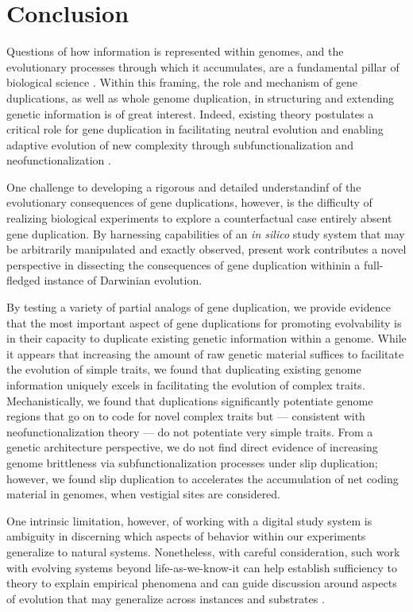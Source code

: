 \section{Conclusion} \label{sec:conclusion}

Questions of how information is represented within genomes, and the evolutionary processes through which it accumulates, are a fundamental pillar of biological science \citep{adami2024evolution}.
Within this framing, the role and mechanism of gene duplications, as well as whole genome duplication, in structuring and extending genetic information is of great interest.
Indeed, existing theory postulates a critical role for gene duplication in facilitating neutral evolution and enabling adaptive evolution of new complexity through subfunctionalization and neofunctionalization \citep{ohno1970evolution}.

One challenge to developing a rigorous and detailed understandinf of the evolutionary consequences of gene duplications, however, is the difficulty of realizing biological experiments to explore a counterfactual case entirely absent gene duplication.
By harnessing capabilities of an \textit{in silico} study system that may be arbitrarily manipulated and exactly observed, present work contributes a novel perspective in dissecting the consequences of gene duplication withinin a full-fledged instance of Darwinian evolution.

By testing a variety of partial analogs of gene duplication, we provide evidence that the most important aspect of gene duplications for promoting evolvability is in their capacity to duplicate existing genetic information within a genome.
While it appears that increasing the amount of raw genetic material suffices to facilitate the evolution of simple traits, we found that duplicating existing genome information uniquely excels in facilitating the evolution of complex traits.
Mechanistically, we found that duplications significantly potentiate genome regions that go on to code for novel complex traits but --- consistent with neofunctionalization theory --- do not potentiate very simple traits.
From a genetic architecture perspective, we do not find direct evidence of increasing genome brittleness via subfunctionalization processes under slip duplication; however, we found slip duplication to accelerates the accumulation of net coding material in genomes, when vestigial sites are considered.

One intrinsic limitation, however, of working with a digital study system is ambiguity in discerning which aspects of behavior within our experiments generalize to natural systems.
Nonetheless, with careful consideration, such work with evolving systems beyond life-as-we-know-it can help establish sufficiency to theory to explain empirical phenomena and can guide discussion around aspects of evolution that may generalize across instances and substrates \citep{dorin2024what}.

